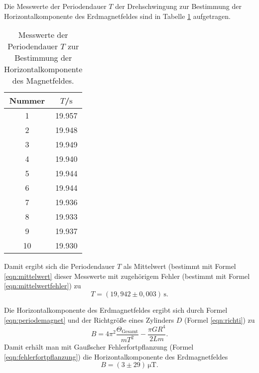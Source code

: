 Die Messwerte der Periodendauer $T$ der Drehschwingung zur Bestimmung der Horizontalkomponente
des Erdmagnetfeldes sind in Tabelle \ref{tab:magnetusmaximus} aufgetragen.
\begin{table}
	\caption{Messwerte der Periodendauer $T$ zur Bestimmung der Horizontalkomponente
	des Magnetfeldes.}
	\label{tab:magnetusmaximus}
	\centering
	\begin{tabular}{cc}
		\toprule
		Nummer & $T$/$\si{\second}$ \\
		\midrule
		1      & 19.957             \\
		2      & 19.948             \\
		3      & 19.949             \\
		4      & 19.940             \\
		5      & 19.944             \\
		6      & 19.944             \\
		7      & 19.936             \\
		8      & 19.933             \\
		9      & 19.937             \\
		10     & 19.930             \\
		\bottomrule
	\end{tabular}
\end{table}
Damit ergibt sich die Periodendauer $T$ als Mittelwert (bestimmt mit Formel
\eqref{eqn:mittelwert} dieser Messwerte mit zugehörigem Fehler (bestimmt mit Formel
\eqref{eqn:mittelwertfehler}) zu
\begin{equation*}
	T = (19,942 \pm 0,003) \, \si{\second} \mathrm{.}
\end{equation*}

Die Horizontalkomponente des Erdmagnetfeldes ergibt sich durch Formel \eqref{eqn:periodemagnet}
und der Richtgröße eines Zylinders $D$ (Formel \eqref{eqn:richti}) zu
\begin{equation}
	B = 4\pi^2\frac{\Theta_{\mathrm{Gesamt}}}{m T^2} - \frac{\pi G R^4}{2Lm} \mathrm{.}
\end{equation}
Damit erhält man mit Gaußscher Fehlerfortpflanzung (Formel \eqref{eqn:fehlerfortpflanzung}) die
Horizontalkomponente des Erdmagnetfeldes
\begin{equation*}
	B = (3 \pm 29) \, \si{\micro\tesla} \mathrm{.}
\end{equation*}
